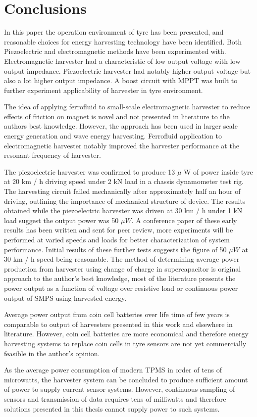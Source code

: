 \section{Conclusions}\label{sect:conclusions}
In this paper the operation environment of tyre has been presented, and reasonable choices for energy harvesting technology have been identified. Both Piezoelectric and electromagnetic methods have been experimented with. Electromagnetic harvester had a characteristic of low output voltage with low output impedance. Piezoelectric harvester had notably higher output voltage but also a lot higher output impedance. A boost circuit with MPPT was built to further experiment applicability of harvester in tyre environment. 

The idea of applying ferrofluid to small-scale electromagnetic harvester to reduce effects of friction on magnet is novel and not presented in literature to the authors best knowledge. However, the approach has been used in larger scale energy generation and wave energy harvesting. Ferrofluid application to electromagnetic harvester notably improved the harvester performance at the resonant frequency of harvester. 

The piezoelectric harvester was confirmed to produce 13 $\mu$ W of power inside tyre at 20 km / h driving speed under 2 kN load in a chassis dynamometer test rig. The harvesting circuit failed mechanically after approximately half an hour of driving, outlining the importance of mechanical structure of device. The results obtained while the piezoelectric harvester was driven at 30 km / h under 1 kN load suggest the output power was 50 $\mu W$. A conference paper of these early results has been written and sent for peer review, more experiments will be performed at varied speeds and loads for better characterization of system performance. Initial results of these further tests suggests the figure of 50 $\mu W$ at 30 km / h speed being reasonable. The method of determining average power production from harvester using change of charge in supercapacitor is original approach to the author's best knowledge, most of the literature presents the power output as a function of voltage over resistive load or continuous power output of SMPS using harvested energy.  

Average power output from coin cell batteries over life time of few years is comparable to output of harvesters presented in this work and elsewhere in literature. However, coin cell batteries are more economical and therefore energy harvesting systems to replace coin cells in tyre sensors are not yet commercially feasible in the author's opinion.

As the average power consumption of modern TPMS in order of tens of microwatts, the harvester system can be concluded to produce sufficient amount of power to supply current sensor systems. However, continuous sampling of sensors and transmission of data requires tens of milliwatts and therefore solutions presented in this thesis cannot supply power to such systems. 
